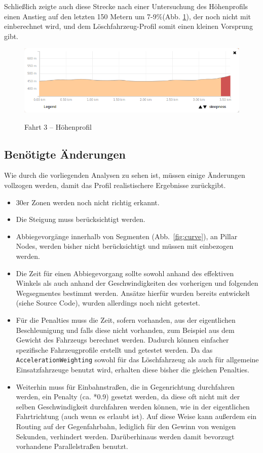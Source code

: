 Schließlich zeigte auch diese Strecke nach einer Untersuchung des Höhenprofils einen Anstieg auf den letzten 150 Metern um 7-9$\%$(Abb. \ref{fig:profile2}), der noch nicht mit einberechnet wird, und dem Löschfahrzeug-Profil somit einen kleinen Vorsprung gibt.

\begin{figure}[htb]
\centering
\caption{Fahrt 3 -- Höhenprofil}
\label{fig:profile2}
\includegraphics[width = 0.90 \textwidth]{../media/Fahrt3_Profile.png} \\
\end{figure}


\subsection{Benötigte Änderungen}

Wie durch die vorliegenden Analysen zu sehen ist, müssen einige Änderungen vollzogen werden, damit das Profil realistischere Ergebnisse zurückgibt.\par
\begin{itemize}
\item 30er Zonen werden noch nicht richtig erkannt.
\item Die Steigung muss berücksichtigt werden.
\item Abbiegevorgänge innerhalb von Segmenten (Abb.~\ref{fig:curve}), an Pillar Nodes, werden bisher nicht berücksichtigt und müssen mit einbezogen werden.
\item Die Zeit für einen Abbiegevorgang sollte sowohl anhand des effektiven Winkels als auch anhand der Geschwindigkeiten des vorherigen und folgenden Wegsegmentes bestimmt werden.
Ansätze hierfür wurden bereits entwickelt (siehe Source Code), wurden allerdings noch nicht getestet.
\item Für die Penalties muss die Zeit, sofern vorhanden, aus der eigentlichen Beschleunigung und falls diese nicht vorhanden, zum Beispiel aus dem Gewicht des Fahrzeugs berechnet werden.
Dadurch können einfacher spezifische Fahrzeugprofile erstellt und getestet werden.
Da das \texttt{AccelerationWeighting} sowohl für das Löschfahrzeug als auch für allgemeine Einsatzfahrzeuge benutzt wird, erhalten diese bisher die gleichen Penalties.
\item Weiterhin muss für Einbahnstraßen, die in Gegenrichtung durchfahren werden, ein Penalty (ca. *0.9) gesetzt werden, da diese oft nicht mit der selben Geschwindigkeit durchfahren werden können, wie in der eigentlichen Fahrtrichtung (auch wenn es erlaubt ist).
Auf diese Weise kann außerdem ein Routing auf der Gegenfahrbahn, lediglich für den Gewinn von wenigen Sekunden, verhindert werden.
Darüberhinaus werden damit bevorzugt vorhandene Parallelstraßen benutzt.
\end{itemize}
